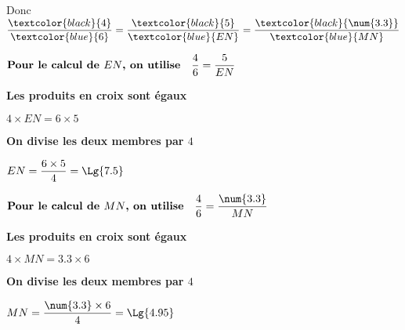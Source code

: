 \begin{multicols}{2}
\begin{enumerate}
{        Donc $\dfrac{\textcolor{black}{4}}{\textcolor{blue}{6}}=\dfrac{\textcolor{black}{5}}{\textcolor{blue}{EN}}=\dfrac{\textcolor{black}{\num{3.3}}}{\textcolor{blue}{MN}}$
        }
    \end{enumerate}

    {\color{red}
        $\mbox{\bf Pour le calcul de $EN$, on utilise} \quad \dfrac{4}{6}=\dfrac{5}{EN}$

        {\bf Les produits en croix sont égaux}

        $4\times EN=6\times 5$

        {\bf On divise les deux membres par $4$}

        $EN=\dfrac{6\times 5}{4}=\Lg{7.5}$
    }

    {\color{red}
        $\mbox{\bf Pour le calcul de $MN$, on utilise} \quad \dfrac{4}{6}=\dfrac{\num{3.3}}{MN}$

        {\bf Les produits en croix sont égaux}

        $4\times MN=\num{3.3}\times 6$

        {\bf On divise les deux membres par $4$}

        $MN=\dfrac{\num{3.3}\times 6}{4}=\Lg{4.95}$
    }
    \end{multicols}
